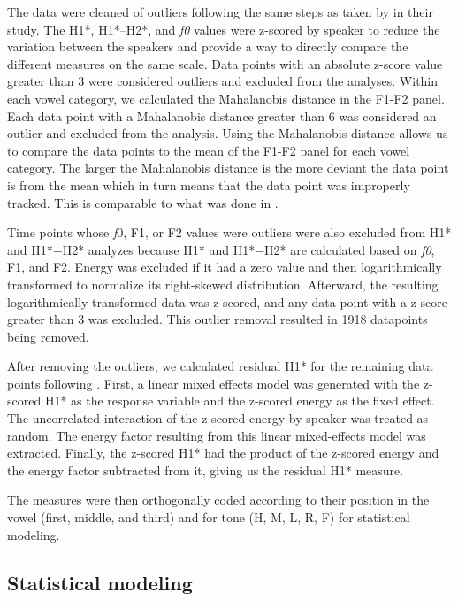 The data were cleaned of outliers following the same steps as taken by \citet{chaiH1H2AcousticMeasure2022} in their study. The H1*, H1*–H2*, and \textit{f0} values were z-scored by speaker to reduce the variation between the speakers and provide a way to directly compare the different measures on the same scale. Data points with an absolute z-score value greater than 3 were considered outliers and excluded from the analyses. Within each vowel category, we calculated the Mahalanobis distance in the F1-F2 panel. Each data point with a Mahalanobis distance greater than 6 was considered an outlier and excluded from the analysis. Using the Mahalanobis distance allows us to compare the data points to the mean of the F1-F2 panel for each vowel category. The larger the Mahalanobis distance is the more deviant the data point is from the mean which in turn means that the data point was improperly tracked. This is comparable to what was done in \citet{seyfarthPlosiveVoicingAcoustics2018,chaiCheckedSyllablesChecked2022,garellekPhoneticsWhiteHmong2023}.

Time points whose \textit{f}0, F1, or F2 values were outliers were also excluded from H1* and H1*$-$H2* analyzes because H1* and H1*$-$H2* are calculated based on \textit{f0}, F1, and F2. Energy was excluded if it had a zero value and then logarithmically transformed to normalize its right-skewed distribution. Afterward, the resulting logarithmically transformed data was z-scored, and any data point with a z-score greater than 3 was excluded. This outlier removal resulted in 1918 datapoints being removed. 

After removing the outliers, we calculated residual H1* for the remaining data points following \citet{chaiH1H2AcousticMeasure2022}. First, a linear mixed effects model was generated with the z-scored H1* as the response variable and the z-scored energy as the fixed effect. The uncorrelated interaction of the z-scored energy by speaker was treated as random. The energy factor resulting from this linear mixed-effects model was extracted. Finally, the z-scored H1* had the product of the z-scored energy and the energy factor subtracted from it, giving us the residual H1* measure.

The measures were then orthogonally coded according to their position in the vowel (first, middle, and third) and for tone (H, M, L, R, F) for statistical modeling.  

\subsection{Statistical modeling} \label{sec:StatisticalModeling}

